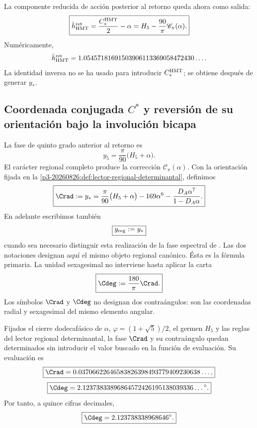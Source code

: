 La componente reducida de acción posterior al retorno queda ahora como
salida:
\[
\boxed{
\bar h_{\rm HMT}^{\rm ret}
=\frac{C_*^{\rm HMT}}2-\alpha
=H_5-\frac{90}{\pi}\mathscr C_\pi(\alpha).}
\]
Numéricamente,
\[
\bar h_{\rm HMT}^{\rm ret}
=1.05457181691503906113369058472430\ldots.
\]
La identidad inversa no se ha usado para introducir \(C_*^{\rm HMT}\); se
obtiene después de generar \(y_*\).

\subsection{Coordenada conjugada \texorpdfstring{\(C^*\)}{C*} y reversión de su orientación bajo la involución bicapa}
\label{sec:s102:c38:4:2}


La fase de quinto grado anterior al retorno es
\[
y_5=\frac\pi{90}\bigl(H_5+\alpha\bigr).
\]
El carácter regional completo produce la corrección
\(\mathscr C_\pi(\alpha)\). Con la orientación fijada en la
\cref{p3-20260826:def:lector-regional-determinantal}, definimos
\[
\boxed{
\Crad:=y_*=\frac\pi{90}\bigl(H_5+\alpha\bigr)
-169\alpha^6
-\frac{D_A\alpha^7}{1-D_A\alpha}.}
\]
En adelante escribimos también
\[
 \boxed{y_{\rm reg}:=y_*}
\]
cuando sea necesario distinguir esta realización de la fase espectral de
\Gtr. Las dos notaciones designan aquí el mismo objeto regional canónico.
Ésta es la fórmula primaria. La unidad sexagesimal no interviene hasta aplicar la carta
\[
\boxed{\Cdeg:=\frac{180}{\pi}\Crad.}
\]
Los símbolos \(\Crad\) y \(\Cdeg\) no designan dos contraángulos: son las
coordenadas radial y sexagesimal del mismo elemento angular.

\begin{theorem}
\label{p3-20260826:thm:contraangulo-regional}
Fijados el cierre dodecafásico de \(\alpha\),
\(\varphi=(1+\sqrt5)/2\), el germen \(H_5\) y las reglas del lector regional
determinantal, la fase \(\Crad\) y su contraángulo quedan determinados sin
introducir el valor buscado en la función de evaluación. Su evaluación es
\[
\boxed{
\Crad=0.03706622646583826398493779409230638\ldots,}
\]
\[
\boxed{
\Cdeg
=2.12373833896864572426195138039336\ldots{}^\circ.}
\]
Por tanto, a quince cifras decimales,
\[
\boxed{\Cdeg=2.123738338968646^\circ.}
\]
\end{theorem}

